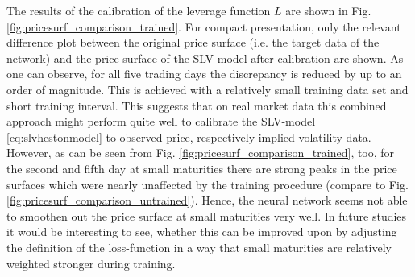 \documentclass[
a4paper,     %
12pt           %
]{scrartcl}  %
\numberwithin{equation}{section}
\begin{document}
The results of the calibration of the leverage function $L$ are shown in Fig. \ref{fig:pricesurf_comparison_trained}. For compact presentation, only the relevant difference plot between the original price surface (i.e. the target data of the network) and the price surface of the SLV-model after calibration are shown. As one can observe, for all five trading days the discrepancy is reduced by up to  an order of magnitude. This is achieved with a relatively small training data set and short training interval. This suggests that on real market data this combined approach might perform quite well to calibrate the SLV-model \eqref{eq:slvhestonmodel} to observed price, respectively implied volatility data. However, as can be seen from Fig. \ref{fig:pricesurf_comparison_trained}, too, for the second and fifth day at small maturities there are strong peaks in the price surfaces which were nearly unaffected by the training procedure (compare to Fig. \ref{fig:pricesurf_comparison_untrained}). Hence, the neural network seems not able to smoothen out the price surface at small maturities very well. In future studies it would be interesting to see, whether this can be improved upon by adjusting the definition of the loss-function in a way that small maturities are relatively weighted stronger during training.
\end{document}
